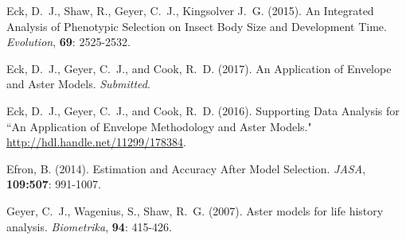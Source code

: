 \documentclass[12pt]{article}
\begin{document}
\begin{thebibliography}{}







Eck, D.~J., Shaw, R., Geyer, C.~J., Kingsolver J.~G. (2015).
\newblock An Integrated Analysis of Phenotypic Selection on Insect Body Size
    and Development Time.
\newblock \emph{Evolution}, \textbf{69}: 2525-2532. 


Eck, D.~J., Geyer, C.~J., and Cook, R.~D. (2017).
\newblock An Application of Envelope and Aster Models.
\newblock \emph{Submitted}.




Eck, D.~J., Geyer, C.~J., and Cook, R.~D. (2016).
\newblock Supporting Data Analysis for 
    ``An Application of Envelope Methodology and Aster Models."
\newblock \url{http://hdl.handle.net/11299/178384}.


Efron, B. (2014).
\newblock Estimation and Accuracy After Model Selection.
\newblock \emph{JASA}, \textbf{109:507}: 991-1007.


Geyer, C.~J., Wagenius, S., Shaw, R.~G. (2007).
\newblock Aster models for life history analysis.
\newblock \emph{Biometrika}, \textbf{94}: 415-426.





\end{thebibliography}
\end{document}
